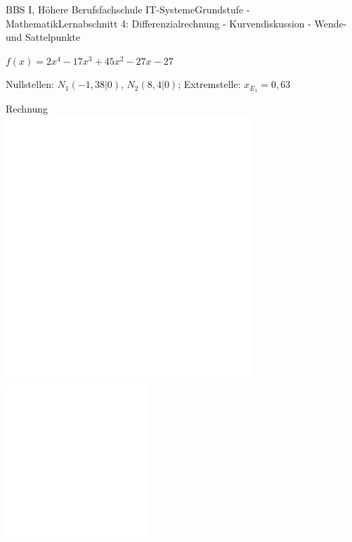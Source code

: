 \documentclass[oneside,openany,headings=optiontotoc,11pt,numbers=noenddot]{scrreprt}
\begin{document}
		\begin{worksheet}{BBS I, Höhere Berufsfachschule IT-Systeme}{Grundstufe - Mathematik}{Lernabschnitt 4: Differenzialrechnung - Kurvendiskussion - Wende- und Sattelpunkte}
			\begin{framed}
				\noindent
				\begin{center}
					\(f(x) = 2x^4 - 17x^3 +45x^2 -27x -27\)
				\end{center}
				Nullstellen: \(N_1(-1,38|0)\), \(N_2(8,4|0)\); Extremstelle: \(x_{E_1} = 0,63\)\\
				\par\noindent
				\footnotesize\color{codegray}Rechnung\\
				\includegraphics[width=0.7\textwidth]{../../empty.jpg}\\
				\includegraphics[width=0.4\textwidth]{../../empty.jpg}
			\end{framed}
		\end{worksheet}
\end{document}
